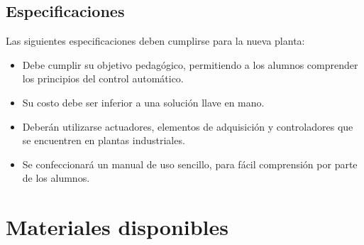 
\subsection{Especificaciones}

Las siguientes especificaciones deben cumplirse para la nueva
planta:

\begin{itemize}
\item Debe cumplir su objetivo pedagógico, permitiendo 
 a los alumnos comprender los principios del control automático.
 \item Su costo debe ser inferior a una solución llave en mano.
 \item Deberán utilizarse actuadores, elementos de adquisición
 y controladores que se encuentren en plantas industriales.
 \item Se confeccionará un manual de uso sencillo, para 
 fácil comprensión por parte de los alumnos.
\end{itemize}

\section{Materiales disponibles}
\label{sec:MaterialesDisponibles}

